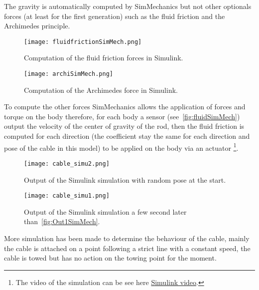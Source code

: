 The gravity is automatically computed by SimMechanics but not other optionals forces (at least for the first generation) such as the fluid friction and the Archimedes principle. 

\begin{figure}[H]
\centering
    \begin{minipage}[b]{0.4\textwidth}
    \centering
    \texttt{[image: fluidfrictionSimMech.png]}
    \caption{Computation of the fluid friction forces in Simulink.}
    \label{fig:fluidSimMech}
    \end{minipage}
    \hfill
    \begin{minipage}[b]{0.4\textwidth}
    \centering
    \texttt{[image: archiSimMech.png]}
    \caption{Computation of the Archimedes force in Simulink.}
    \label{fig:archSimMech}
    \end{minipage}
\end{figure}

To compute the other forces SimMechanics allows the application of forces and torque on the body therefore, for each
body a sensor (see~\ref{fig:fluidSimMech}) output the velocity of the center of gravity of the rod, then the 
fluid friction is computed for each direction (the coefficient stay the same for each direction and pose of the cable in this model) to be applied on the body via an actuator \footnote{The video of the simulation can be see here \href{https://youtu.be/xEDApnU54ac}{Simulink video}.}.

\begin{figure}[H]
\centering
    \begin{minipage}[b]{0.5\textwidth}
    \centering
    \texttt{[image: cable\_simu2.png]}
    \caption{Output of the Simulink simulation with random pose at the start.}
    \label{fig:Out1SimMech}
    \end{minipage}
    \hfill
    \begin{minipage}[b]{0.45\textwidth}
    \centering
    \texttt{[image: cable\_simu1.png]}
    \caption{Output of the Simulink simulation a few second later than~\ref{fig:Out1SimMech}.}
    \label{fig:Out2SimMech}
    \end{minipage}
\end{figure}


More simulation has been made to determine the behaviour of the cable, mainly the cable is attached on a point following a strict line with a constant speed, the cable is towed but has no action on the towing point for the moment.

